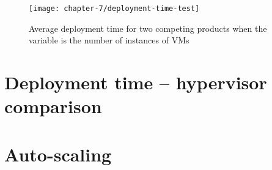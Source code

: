 \begin{figure}[!ht]
  \begin{center}
    \texttt{[image: chapter-7/deployment-time-test]}
  \end{center}
  \caption{Average deployment time for two competing products when the variable is the number of instances of VMs}
  \label{ch7:deployment-time-test}
\end{figure}

\section{Deployment time -- hypervisor comparison}

\section{Auto-scaling}
